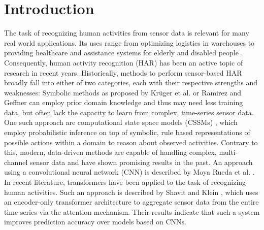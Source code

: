 \documentclass[11pt,titlepage,oneside,openany]{book}
\begin{document}
\tableofcontents
\newpage



\listoffigures

\listoftables

\newpage


\chapter{Introduction}
\label{cha:intro}
The task of recognizing human activities from sensor data is relevant for many real world applications. Its uses range from optimizing logistics in warehouses to providing healthcare and assistance systems for elderly and disabled people \cite{ludtke_human_2021, chen_sensor-based_2012}. Consequently, human activity recognition (HAR) has been an active topic of research in recent years. Historically, methods to perform sensor-based HAR broadly fall into either of two categories, each with their respective strengths and weaknesses: Symbolic methods as proposed by Kr\"uger et al. or Ramirez and Geffner \cite{kruger_computational_2014, ramirez_goal_2011} can employ prior domain knowledge and thus may need less training data, but often lack the capacity to learn from complex, time-series sensor data. One such approach are computational state space models (CSSMs) \cite{kruger_computational_2014}, which employ probabilistic inference on top of symbolic, rule based representations of possible actions within a domain to reason about observed activities. Contrary to this, modern, data-driven methods are capable of handling complex, multi-channel sensor data and have shown promising results in the past. An approach using a convolutional neural network (CNN) is described by Moya Rueda et al. \cite{moya_rueda_convolutional_2018}. In recent literature, transformers have been applied to the task of recognizing human activities. Such an approach is described by Shavit and Klein \cite{shavit_boosting_2021}, which uses an encoder-only transformer architecture to aggregate sensor data from the entire time series via the attention mechanism. Their results indicate that such a system improves prediction accuracy over models based on CNNs.
\end{document}
